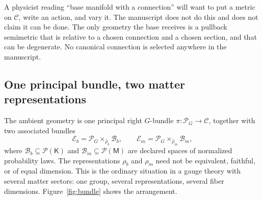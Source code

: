 \documentclass[11pt,letterpaper]{article}
\newcommand{\Law}{\mathcal P}
\begin{document}
\begin{boundarybox}
A physicist reading ``base manifold with a connection'' will want to put a metric on \(\mathcal C\), write an action, and vary it. The manuscript does not do this and does not claim it can be done. The only geometry the base receives is a pullback semimetric that is relative to a chosen connection and a chosen section, and that can be degenerate. No canonical connection is selected anywhere in the manuscript.
\end{boundarybox}

\subsection{One principal bundle, two matter representations}

The ambient geometry is one principal right \(G\)-bundle \(\pi:\mathscr P_G\to\mathcal C\), together with two associated bundles
\begin{equation}
  \mathcal E_b=\mathscr P_G\times_{\widehat\rho_b}\mathcal B_b,
  \qquad
  \mathcal E_m=\mathscr P_G\times_{\widehat\rho_m}\mathcal B_m,
  \label{eq:associated}
\end{equation}
where \(\mathcal B_b\subseteq\Law(\mathsf K)\) and \(\mathcal B_m\subseteq\Law(\mathsf M)\) are declared spaces of normalized probability laws. The representations \(\rho_b\) and \(\rho_m\) need not be equivalent, faithful, or of equal dimension. This is the ordinary situation in a gauge theory with several matter sectors: one group, several representations, several fiber dimensions. Figure~\ref{fig:bundle} shows the arrangement.
\end{document}
